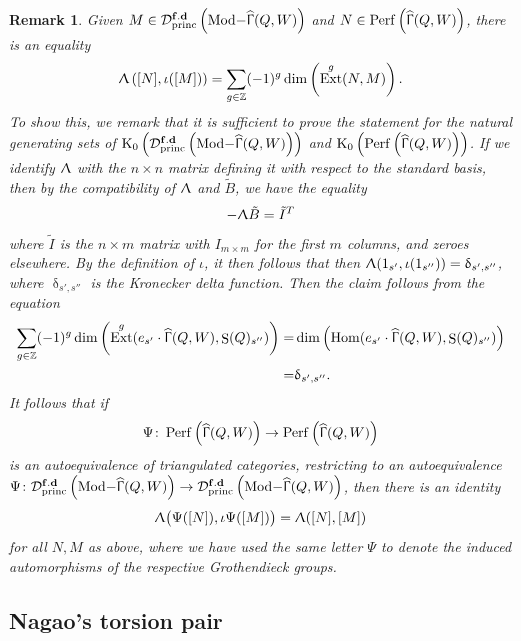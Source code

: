 \documentclass[a4paper,10pt]{amsart}
\newtheorem{remark}[theorem]{Remark}
\DeclareMathOperator{\Simp}{S}
\renewcommand{\delta}{\updelta}
\renewcommand{\Lambda}{\Uplambda}
\renewcommand{\Gamma}{\Upgamma}
\DeclareMathOperator{\KK}{K_0}
\DeclareMathOperator{\Hom}{Hom}
\DeclareMathOperator{\Ext}{Ext}
\DeclareMathOperator{\fd}{\mathbf{f.d}}
\DeclareMathOperator{\Tmod}{Mod-}
\newcommand{\Rmod}[1]{\Tmod\!#1}
\DeclareMathOperator{\Perf}{Perf}
\DeclareMathOperator{\HGamma}{\widehat{\Gamma}}
\DeclareMathOperator{\princ}{princ}
\newcommand{\Dub}{\mathcal{D}}
\begin{document}
\begin{remark}
\label{muComm}
Given $M\in\Dub^{\fd}_{\princ}\left(\Rmod{\HGamma(Q,W)}\right)$ and $N\in\Perf\left(\HGamma(Q,W)\right)$, there is an equality
\[
\Lambda\left([N],\iota([M])\right)=\sum_{g\in\mathbb{Z}}(-1)^g\dim\left(\Ext^g(N,M)\right).
\]
To show this, we remark that it is sufficient to prove the statement for the natural generating sets of $\KK\left(\Dub_{\princ}^{\fd}\left(\Rmod{\HGamma(Q,W)}\right)\right)$ and $\KK\left(\Perf\left(\HGamma(Q,W)\right)\right)$.  If we identify $\Lambda$ with the $n\times n$ matrix defining it with respect to the standard basis, then by the compatibility of $\Lambda$ and $\tilde{B}$, we have the equality
\[
-\Lambda \tilde{B}=\tilde{I}^T
\]
where $\tilde{I}$ is the $n\times m$ matrix with $I_{m\times m}$ for the first $m$ columns, and zeroes elsewhere.  By the definition of $\iota$, it then follows that then $\Lambda(1_{s'},\iota(1_{s''}))=\delta_{s',s''}$, where $\delta_{s',s''}$ is the Kronecker delta function.  Then the claim follows from the equation
\begin{align*}
\sum_{g\in\mathbb{Z}}(-1)^g\dim\left(\Ext^g(e_{s'}\cdot \HGamma(Q,W),\Simp(Q)_{s''})\right)=&\dim\left(\Hom(e_{s'}\cdot \HGamma(Q,W),\Simp(Q)_{s''})\right)\\=&\delta_{s',s''}.
\end{align*}
It follows that if 
\[
\Psi\colon \Perf\left(\HGamma(Q,W)\right)\rightarrow\Perf\left(\HGamma(Q,W)\right)
\]
is an autoequivalence of triangulated categories, restricting to an autoequivalence $\Psi\colon\Dub^{\fd}_{\princ}\left(\Rmod{\HGamma(Q,W)}\right)\rightarrow\Dub^{\fd}_{\princ}\left(\Rmod{\HGamma(Q,W)}\right)$, then there is an identity
\[
\Lambda\big(\Psi([N]),\iota\Psi([M])\big)=\Lambda([N],[M])
\]
for all $N,M$ as above, where we have used the same letter $\Psi$ to denote the induced automorphisms of the respective Grothendieck groups.
\end{remark}



\subsection{Nagao's torsion pair}\label{Tpair}
\end{document}

